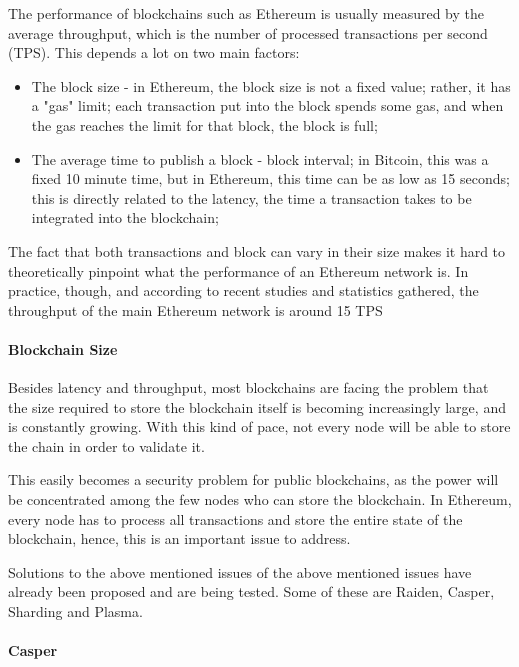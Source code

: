 The performance of blockchains such as Ethereum is usually measured by the average throughput, which is the number of processed transactions per second (TPS). This depends a lot on two main factors:
\begin{itemize}
\item The block size - in Ethereum, the block size is not a fixed value; rather, it has a "gas" limit; each transaction put into the block spends some gas, and when the gas reaches the limit for that block, the block is full;
\item The average time to publish a block - block interval; in Bitcoin, this was a fixed 10 minute time, but in Ethereum, this time can be as low as 15 seconds; this is directly related to the latency, the time a transaction takes to be integrated into the blockchain;
\end{itemize}

The fact that both transactions and block can vary in their size makes it hard to theoretically pinpoint what the performance of an Ethereum network is. In practice, though, and according to recent studies and statistics gathered, the throughput of the main Ethereum network is around 15 TPS %

\paragraph{Blockchain Size}
Besides latency and throughput, most blockchains are facing the problem that the size required to store the blockchain itself is becoming increasingly large, and is constantly growing. With this kind of pace, not every node will be able to store the chain in order to validate it.

This easily becomes a security problem for public blockchains, as the power will be concentrated among the few nodes who can store the blockchain. In Ethereum, every node has to process all transactions and store the entire state of the blockchain,  hence, this is an important issue to address. 

Solutions to the above mentioned issues of the above mentioned issues have already been proposed and are being tested. Some of these are Raiden, Casper, Sharding and Plasma.

\paragraph{Casper}

